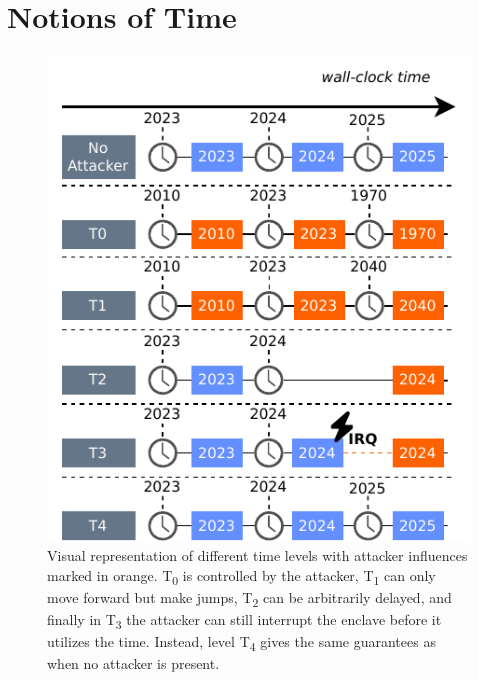 \documentclass[sigplan,10pt]{acmart}
\begin{document}
\section{Notions of Time}
\label{section:notions-time}
\newcommand{\Tzero} {T\textsubscript{0}\xspace}
\newcommand{\Tone}  {T\textsubscript{1}\xspace}
\newcommand{\Ttwo}  {T\textsubscript{2}\xspace}
\newcommand{\Tthree}{T\textsubscript{3}\xspace}
\newcommand{\Tfour} {T\textsubscript{4}\xspace}

\begin{figure}
	\vspace{-1.5ex}
	\centering
	\includegraphics[width=\columnwidth]{figures/time-levels.pdf}
	\caption{Visual representation of different time levels with attacker
	influences marked in orange. \Tzero{} is controlled by the attacker, \Tone can
	only move forward but make jumps, \Ttwo can be arbitrarily delayed, and
	finally in \Tthree the attacker can still interrupt the enclave before it
	utilizes the time. Instead, level \Tfour{} gives the same guarantees as when
	no attacker is present.}
	\label{fig:time-types}
	\vspace{-3ex}
\end{figure}
\end{document}
